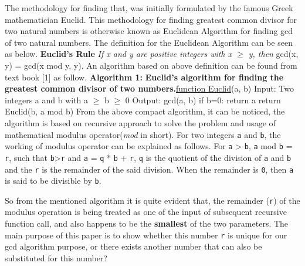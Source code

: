 \documentclass[12pt]{article}
\begin{document}
\begin{multicols}{2}
The methodology for finding that, was initially formulated by the famous Greek mathematician Euclid. This methodology for finding greatest common divisor for two natural numbers is otherwise known as Euclidean Algorithm for finding gcd of two 
natural numbers. The definition for the Euclidean Algorithm can be seen as below.
\newline \newline \textbf {Euclid's Rule} \textit {If x and y are positive integers with x $\geq$ y,
 then} \break \vspace{0mm} \hspace{4cm} gcd(x, y) = gcd(x mod y, y).
\newline 
\newline An algorithm based on above definition can be found from text book [1] as follow.
\newline \textbf{Algorithm 1:}
\newline \textbf {Euclid's algorithm for finding the greatest common divisor of two numbers.}\newline \underline {function Euclid}(a, b)
\newline Input: Two integers a and b with a $\geq$ b $\geq$ 0 
\newline Output: gcd(a, b)
\newline
\newline if b=0: return a
\newline return Euclid(b, a mod b)
\newline 
\newline From the above compact algorithm, it can be noticed, the algorithm is based on recursive approach to solve the problem and usage of mathematical modulus operator(\textit {mod} in short).
For two integers \texttt{a} and \texttt{b}, the working of modulus operator can be explained as follows.
For \texttt{a} > \texttt{b}, \texttt{a} mod \texttt{b} = \texttt{r},  such that \texttt{b}>\texttt{r} and  \texttt{a} = \texttt{q} * \texttt{b} + \texttt{r}, \texttt{q} is the quotient of the division of \texttt{a} and \texttt{b} and the \texttt{r} is the remainder of the said division. When the remainder is \texttt{0}, then \texttt{a} is said to be divisible by \texttt{b}.

So from the mentioned algorithm it is quite evident that, the remainder (\texttt{r}) of the modulus operation is being treated as one of the input of subsequent recursive function call, and also happens to be the \textbf{smallest} of the two parameters.
The main purpose of this paper is to show whether this number \texttt{r} is unique for our gcd algorithm purpose, or there exists another number that can also be substituted for this number?


\end{multicols}
\end{document}
